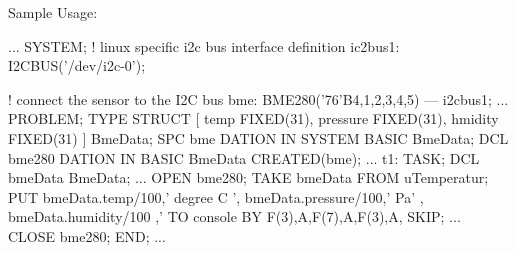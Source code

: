 Sample Usage:
\begin{PEARLCode}
...
SYSTEM;
   ! linux specific i2c bus interface definition
   ic2bus1: I2CBUS('/dev/i2c-0');

   ! connect the sensor to the I2C bus
   bme: BME280('76'B4,1,2,3,4,5) --- i2cbus1;
...
PROBLEM;
   TYPE STRUCT [ temp     FIXED(31), 
                 pressure FIXED(31),
                 hmidity  FIXED(31) ] BmeData;
   SPC bme DATION IN SYSTEM BASIC BmeData;
   DCL bme280 DATION IN BASIC BmeData CREATED(bme);
...
t1: TASK;
   DCL bmeData BmeData;
...
   OPEN bme280;
   TAKE bmeData FROM uTemperatur;
   PUT bmeData.temp/100,' degree C ',
       bmeData.pressure/100,' Pa' ,
       bmeData.humidity/100 ,'%
    TO console BY F(3),A,F(7),A,F(3),A, SKIP;
...
   CLOSE bme280;
END;
...
\end{PEARLCode}

